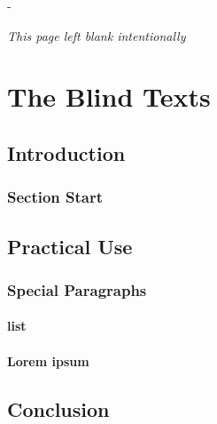 \documentclass[a4paper]{memoir}
\newlength{\mylength}
\def\clearpagetext{%
\thispagestyle{empty}
\calccentering{\mylength}
\begin{vplace}
  \begin{adjustwidth*}{\mylength}{-\mylength}
    \begin{center}
      \textit{This page left blank intentionally}
    \end{center}
  \end{adjustwidth*}
\end{vplace}}
\begin{document}
\pagestyle{Ruled}
\frontmatter
\tableofcontents

\clearpage
\clearpagetext

\mainmatter
\part{The Blind Texts}

\chapter{Introduction}

\section{Section Start}

\blindmathpaper

\chapter{Practical Use}

\section{Special Paragraphs}

\subsection{list}


\subsection{Lorem ipsum}

\blindtext[2]

\chapter{Conclusion}

\end{document}

